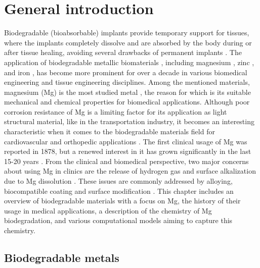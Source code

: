 \chapter{General introduction}\label{ch:introduction}


Biodegradable (bioabsorbable) implants provide temporary support for tissues, where the implants completely dissolve and are absorbed by the body during or after tissue healing, avoiding several drawbacks of permanent implants \cite{Gao2022}. The application of biodegradable metallic biomaterials \cite{Zheng2014, Liu2019, Han2019}, including magnesium \cite{Zhao2017,Zhen2013,Willumeit-Roemer2019}, zinc \cite{Venezuela2019,Mostaed2018}, and iron \cite{Schinhammer2010}, has become more prominent for over a decade in various biomedical engineering and tissue engineering disciplines. Among the mentioned materials, magnesium (Mg) is the most studied metal \cite{Esmaily2017}, the reason for which is its suitable mechanical and chemical properties for biomedical applications. Although poor corrosion resistance of Mg is a limiting factor for its application as light structural material, like in the transportation industry, it becomes an interesting characteristic when it comes to the biodegradable materials field for cardiovascular and orthopedic applications \cite{Heublein2003,Staiger2006,Walker2014}. The first clinical usage of Mg was reported in 1878, but a renewed interest in it has grown significantly in the last 15-20 years \cite{Esmaily2017}. From the clinical and biomedical perspective, two major concerns about using Mg in clinics are the release of hydrogen gas and surface alkalization due to Mg dissolution \cite{Cecchinato2015}. These issues are commonly addressed by alloying, biocompatible coating and surface modification \cite{Esmaily2017}. This chapter includes an overview of biodegradable materials with a focus on Mg, the history of their usage in medical applications, a description of the chemistry of Mg biodegradation, and various computational models aiming to capture this chemistry.

\section{Biodegradable metals}

